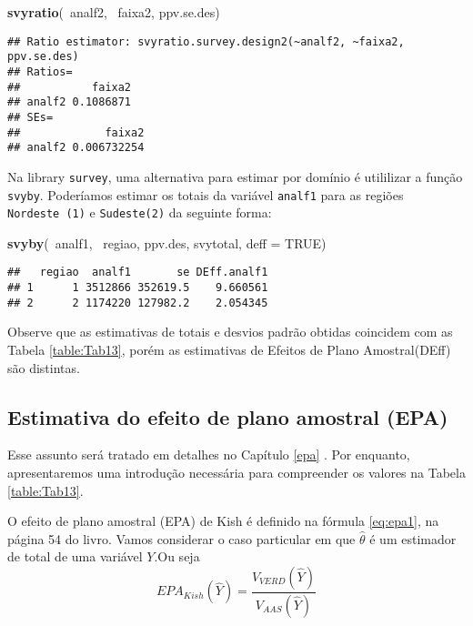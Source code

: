 \documentclass[]{book}
\newenvironment{Shaded}{\begin{snugshade}}{\end{snugshade}}
\newcommand{\KeywordTok}[1]{\textcolor[rgb]{0.13,0.29,0.53}{\textbf{{#1}}}}
\newcommand{\DataTypeTok}[1]{\textcolor[rgb]{0.13,0.29,0.53}{{#1}}}
\newcommand{\OtherTok}[1]{\textcolor[rgb]{0.56,0.35,0.01}{{#1}}}
\newcommand{\NormalTok}[1]{{#1}}
\numberwithin{example}{chapter}
\numberwithin{remark}{chapter}
\numberwithin{definition}{chapter}
\begin{document}
\begin{Shaded}
\begin{Highlighting}[]
\KeywordTok{svyratio}\NormalTok{(~analf2, ~faixa2, ppv.se.des)}
\end{Highlighting}
\end{Shaded}

\begin{verbatim}
## Ratio estimator: svyratio.survey.design2(~analf2, ~faixa2, ppv.se.des)
## Ratios=
##           faixa2
## analf2 0.1086871
## SEs=
##             faixa2
## analf2 0.006732254
\end{verbatim}

Na library \texttt{survey}, uma alternativa para estimar por domínio é
utililizar a função \texttt{svyby}. Poderíamos estimar os totais da
variável \texttt{analf1} para as regiões \texttt{Nordeste\ (1)} e
\texttt{Sudeste(2)} da seguinte forma:

\begin{Shaded}
\begin{Highlighting}[]
\KeywordTok{svyby}\NormalTok{(~analf1, ~regiao, ppv.des, svytotal, }\DataTypeTok{deff =} \OtherTok{TRUE}\NormalTok{)}
\end{Highlighting}
\end{Shaded}

\begin{verbatim}
##   regiao  analf1       se DEff.analf1
## 1      1 3512866 352619.5    9.660561
## 2      2 1174220 127982.2    2.054345
\end{verbatim}

Observe que as estimativas de totais e desvios padrão obtidas coincidem
com as Tabela \ref{table:Tab13}, porém as estimativas de Efeitos de
Plano Amostral(DEff) são distintas.

\subsection{Estimativa do efeito de plano amostral
(EPA)}\label{estimativa-do-efeito-de-plano-amostral-epa}

Esse assunto será tratado em detalhes no Capítulo \ref{epa} . Por
enquanto, apresentaremos uma introdução necessária para compreender os
valores na Tabela \ref{table:Tab13}.

O efeito de plano amostral (EPA) de Kish é definido na fórmula
\eqref{eq:epa1}, na página 54 do livro. Vamos considerar o caso particular
em que \(\hat{\theta}\) é um estimador de total de uma variável \(Y\).Ou
seja \[
EPA_{Kish}\left(\widehat{Y}\right)=\frac{V_{VERD}\left(\widehat{Y}\right)}{V_{AAS}\left(\widehat{Y}\right)}
\]
\end{document}
